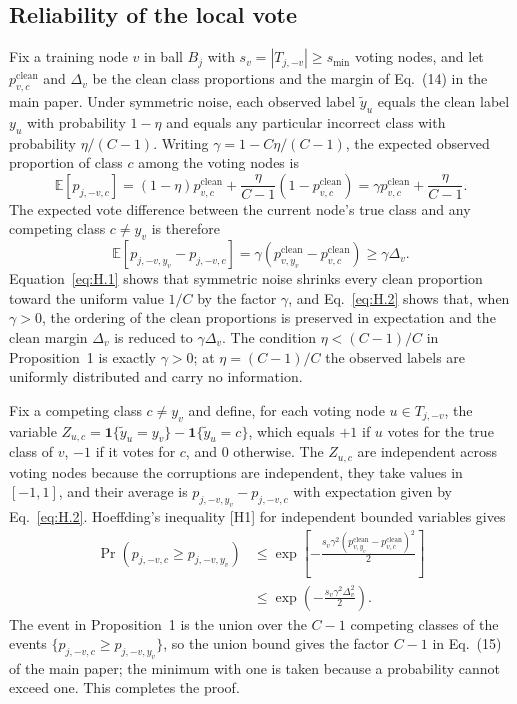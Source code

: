 \documentclass[10pt,letterpaper,nopreprintline]{elsarticle}
\begin{document}
\subsection{Reliability of the local vote}\label{sec:H.1}

Fix a training node \(v\) in ball \(B_j\) with \(s_v=|T_{j,-v}|\geq s_{\min}\) voting nodes, and let \(p^{\mathrm{clean}}_{v,c}\) and \(\Delta_v\) be the clean class proportions and the margin of Eq.~(14) in the main paper. Under symmetric noise, each observed label \(\widetilde y_u\) equals the clean label \(y_u\) with probability \(1-\eta\) and equals any particular incorrect class with probability \(\eta/(C-1)\). Writing \(\gamma=1-C\eta/(C-1)\), the expected observed proportion of class \(c\) among the voting nodes is
\begin{equation}\label{eq:H.1}
\mathbb{E}[p_{j,-v,c}]=(1-\eta)p^{\mathrm{clean}}_{v,c}
+\frac{\eta}{C-1}(1-p^{\mathrm{clean}}_{v,c})
=\gamma p^{\mathrm{clean}}_{v,c}+\frac{\eta}{C-1}.
\end{equation}
The expected vote difference between the current node's true class and any competing class \(c\ne y_v\) is therefore
\begin{equation}\label{eq:H.2}
\mathbb{E}[p_{j,-v,y_v}-p_{j,-v,c}]
=\gamma(p^{\mathrm{clean}}_{v,y_v}-p^{\mathrm{clean}}_{v,c})\geq\gamma\Delta_v.
\end{equation}
Equation~\eqref{eq:H.1} shows that symmetric noise shrinks every clean proportion toward the uniform value \(1/C\) by the factor \(\gamma\), and Eq.~\eqref{eq:H.2} shows that, when \(\gamma>0\), the ordering of the clean proportions is preserved in expectation and the clean margin \(\Delta_v\) is reduced to \(\gamma\Delta_v\). The condition \(\eta<(C-1)/C\) in Proposition~1 is exactly \(\gamma>0\); at \(\eta=(C-1)/C\) the observed labels are uniformly distributed and carry no information.

Fix a competing class \(c\ne y_v\) and define, for each voting node \(u\in T_{j,-v}\), the variable \(Z_{u,c}=\mathbf{1}\{\widetilde y_u=y_v\}-\mathbf{1}\{\widetilde y_u=c\}\), which equals \(+1\) if \(u\) votes for the true class of \(v\), \(-1\) if it votes for \(c\), and 0 otherwise. The \(Z_{u,c}\) are independent across voting nodes because the corruptions are independent, they take values in \([-1,1]\), and their average is \(p_{j,-v,y_v}-p_{j,-v,c}\) with expectation given by Eq.~\eqref{eq:H.2}. Hoeffding's inequality [H1] for independent bounded variables gives
\begin{equation}\label{eq:H.3}
\begin{aligned}
\Pr(p_{j,-v,c}\geq p_{j,-v,y_v})
&\leq\exp\!\left[-\frac{s_v\gamma^2(p^{\mathrm{clean}}_{v,y_v}-p^{\mathrm{clean}}_{v,c})^2}{2}\right]\\
&\leq\exp\!\left(-\frac{s_v\gamma^2\Delta_v^2}{2}\right).
\end{aligned}
\end{equation}
The event in Proposition~1 is the union over the \(C-1\) competing classes of the events \(\{p_{j,-v,c}\geq p_{j,-v,y_v}\}\), so the union bound gives the factor \(C-1\) in Eq.~(15) of the main paper; the minimum with one is taken because a probability cannot exceed one. This completes the proof.
\end{document}
